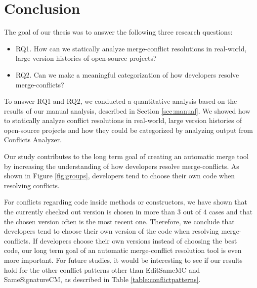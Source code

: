\chapter{Conclusion}
The goal of our thesis was to answer the following three research questions:
\begin{itemize}
\item RQ1. How can we statically analyze merge-conflict resolutions in real-world, large version histories of open-source projects?
\item RQ2. Can we make a meaningful categorization of how developers resolve merge-conflicts?
\end{itemize}

To answer RQ1 and RQ2, we conducted a quantitative analysis based on the results of our manual analysis, described in Section \ref{sec:manual}. We showed how to statically analyze conflict resolutions in real-world, large version histories of open-source projects and how they could be categorized by analyzing output from Conflicts Analyzer.

Our study contributes to the long term goal of creating an automatic merge tool by increasing the understanding of how developers resolve merge-conflicts. As shown in Figure \ref{fig:groups}, developers tend to choose their own code when resolving conflicts.

For conflicts regarding code inside methods or constructors, we have shown that the currently checked out version is chosen in more than 3 out of 4 cases and that the chosen version often is the most recent one. Therefore, we conclude that developers tend to choose their own version of the code when resolving merge-conflicts. If developers choose their own versions instead of choosing the best code, our long term goal of an automatic merge-conflict resolution tool is even more important. For future studies, it would be interesting to see if our results hold for the other conflict patterns other than EditSameMC and SameSignatureCM, as described in Table \ref{table:conflictpatterns}.


